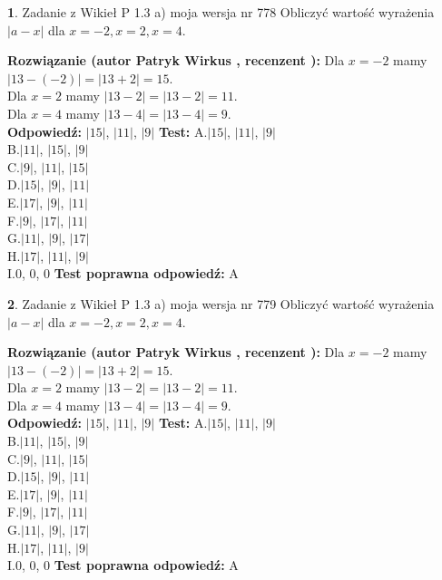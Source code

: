 \documentclass[12pt, a4paper]{article}
\theoremstyle{definition} %
\newtheorem{zad}{}
\newcommand{\zadStart}[1]{\begin{zad}#1\newline}
\newcommand{\zadStop}{\end{zad}}
\newcommand{\rozwStart}[2]{\noindent \textbf{Rozwiązanie (autor #1 , recenzent #2): }\newline}
\newcommand{\rozwStop}{\newline}
\newcommand{\odpStart}{\noindent \textbf{Odpowiedź:}\newline}
\newcommand{\odpStop}{\newline}
\newcommand{\testStart}{\noindent \textbf{Test:}\newline}
\newcommand{\testStop}{\newline}
\newcommand{\kluczStart}{\noindent \textbf{Test poprawna odpowiedź:}\newline}
\newcommand{\kluczStop}{\newline}
\begin{document}
\zadStart{Zadanie z Wikieł P 1.3 a) moja wersja nr 778}
Obliczyć wartość wyrażenia $|a - x|$ dla $x=-2,x=2,x=4$.
\zadStop
\rozwStart{Patryk Wirkus}{}
Dla $x = -2$ mamy $|13 - (-2)| = |13 + 2| = 15$.\\
Dla $x = 2$ mamy $|13 - 2| = |13 - 2| = 11$.\\
Dla $x = 4$ mamy $|13 - 4| = |13 - 4| = 9$.\\
\rozwStop
\odpStart
$|15|$, $|11|$, $|9|$
\odpStop
\testStart
A.$|15|$, $|11|$, $|9|$\\
B.$|11|$, $|15|$, $|9|$\\
C.$|9|$, $|11|$, $|15|$\\
D.$|15|$, $|9|$, $|11|$\\
E.$|17|$, $|9|$, $|11|$\\
F.$|9|$, $|17|$, $|11|$\\
G.$|11|$, $|9|$, $|17|$\\
H.$|17|$, $|11|$, $|9|$\\
I.$0$, $0$, $0$
\testStop
\kluczStart
A
\kluczStop



\zadStart{Zadanie z Wikieł P 1.3 a) moja wersja nr 779}
Obliczyć wartość wyrażenia $|a - x|$ dla $x=-2,x=2,x=4$.
\zadStop
\rozwStart{Patryk Wirkus}{}
Dla $x = -2$ mamy $|13 - (-2)| = |13 + 2| = 15$.\\
Dla $x = 2$ mamy $|13 - 2| = |13 - 2| = 11$.\\
Dla $x = 4$ mamy $|13 - 4| = |13 - 4| = 9$.\\
\rozwStop
\odpStart
$|15|$, $|11|$, $|9|$
\odpStop
\testStart
A.$|15|$, $|11|$, $|9|$\\
B.$|11|$, $|15|$, $|9|$\\
C.$|9|$, $|11|$, $|15|$\\
D.$|15|$, $|9|$, $|11|$\\
E.$|17|$, $|9|$, $|11|$\\
F.$|9|$, $|17|$, $|11|$\\
G.$|11|$, $|9|$, $|17|$\\
H.$|17|$, $|11|$, $|9|$\\
I.$0$, $0$, $0$
\testStop
\kluczStart
A
\kluczStop
\end{document}
